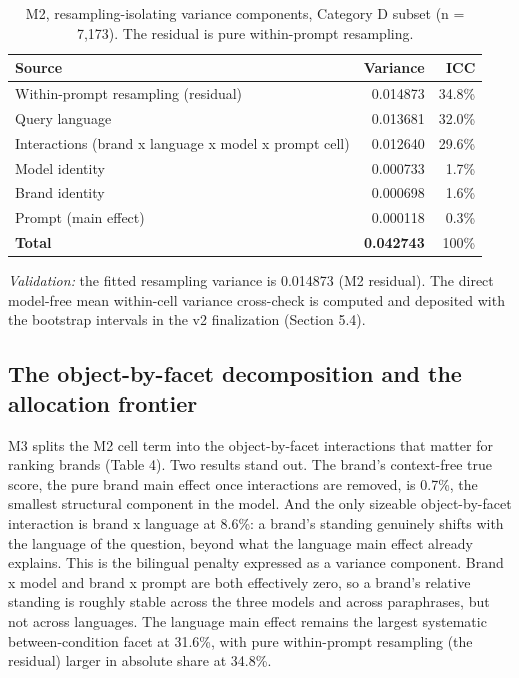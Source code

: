 \documentclass[pdflatex,sn-mathphys-num]{sn-jnl}
\begin{document}
\begin{table}[htbp]
\caption{M2, resampling-isolating variance components, Category D subset (n = 7,173). The residual is pure within-prompt resampling.}
\small
\begin{tabularx}{\textwidth}{@{}>{\raggedright\arraybackslash}Xrr@{}}
\toprule
Source & Variance & ICC \\
\midrule

Within-prompt resampling (residual) & 0.014873 & 34.8\% \\
Query language & 0.013681 & 32.0\% \\
Interactions (brand x language x model x prompt cell) & 0.012640 & 29.6\% \\
Model identity & 0.000733 & 1.7\% \\
Brand identity & 0.000698 & 1.6\% \\
Prompt (main effect) & 0.000118 & 0.3\% \\
\textbf{Total} & \textbf{0.042743} & 100\% \\
\bottomrule
\end{tabularx}
\end{table}

\emph{Validation:} the fitted resampling variance is 0.014873 (M2 residual). The direct model-free mean within-cell variance cross-check is computed and deposited with the bootstrap intervals in the v2 finalization (Section 5.4).

\subsection{The object-by-facet decomposition and the allocation frontier}\label{the-object-by-facet-decomposition-and-the-allocation-frontier}

M3 splits the M2 cell term into the object-by-facet interactions that matter for ranking brands (Table 4). Two results stand out. The brand's context-free true score, the pure brand main effect once interactions are removed, is 0.7\%, the smallest structural component in the model. And the only sizeable object-by-facet interaction is brand x language at 8.6\%: a brand's standing genuinely shifts with the language of the question, beyond what the language main effect already explains. This is the bilingual penalty expressed as a variance component. Brand x model and brand x prompt are both effectively zero, so a brand's relative standing is roughly stable across the three models and across paraphrases, but not across languages. The language main effect remains the largest systematic between-condition facet at 31.6\%, with pure within-prompt resampling (the residual) larger in absolute share at 34.8\%.
\end{document}
